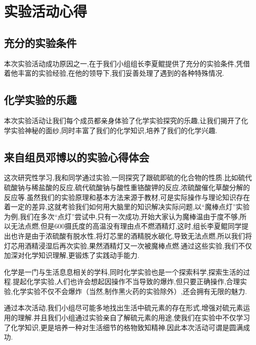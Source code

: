 \documentclass[hyperref,UTF8]{ctexart}
\begin{document}
\section{实验活动心得}

\subsection{充分的实验条件}

本次实验活动成功原因之一,在于我们小组组长李夏鲲提供了充分的实验条件,凭借着他丰富的实验经验,在他的领导下,我们妥善处理了遇到的各种特殊情况.

\subsection{化学实验的乐趣}

本次实验活动让我们每个成员都亲身体验了化学实验探究的乐趣,让我们揭开了化学实验神秘的面纱,同时丰富了我们的化学知识,培养了我们的化学兴趣.

\subsection{来自组员邓博以的实验心得体会}

这次研究性学习,我和同学通过实验,一同探究了跟硫即硫的化合物的性质.比如硫代硫酸钠与稀盐酸的反应,硫代硫酸钠与酸性重铬酸钾的反应,浓硫酸催化草酸分解的反应等.虽然我们的实验原理和基本方法来源于教材,可是实际操作与理论知识存在着一定的差异,这就考验我们如何用大脑里的知识解决实际问题,以“魔棒点灯”实验为例,我们在多次“点灯”尝试中,只有一次成功,开始大家认为魔棒温由于度不够,所以无法点燃,但是600摄氏度的高温没有理由点不燃酒精灯,这时,组长李夏鲲同学提出也许是由于浓硫酸有脱水性,将灯芯里的酒精脱水碳化,导致无法点燃,所以我们将灯芯用酒精浸湿后再次实验,果然酒精灯又一次被魔棒点燃.通过这些实验,我们不仅加深对化学知识理解,更锻炼了实践动手能力.

化学是一门与生活息息相关的学科,同时化学实验也是一个探索科学,探索生活的过程.提起化学实验,人们也许会想起因操作不当导致的爆炸,但只要正确操作,合理实验,化学实验不仅不会爆炸（当然,制作黑火药的实验除外）,还会拥有无限的魅力.

通过本次活动,我们小组尽可能多地找出生活中硫元素的存在形式,增强对硫元素运用的理解.并且我们小组通过实验亲自了解硫元素的用途,使我们在实验中不仅学习了化学知识,更是培养一种对生活细节的格物致知精神.因此本次活动可谓是圆满成功.
\end{document}
